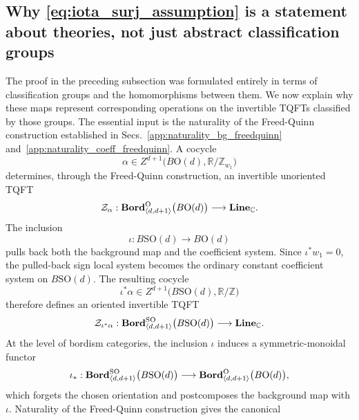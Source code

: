 \documentclass[aps,prx,reprint,superscriptaddress,twocolumn,amsmath,amssymb,amsfonts, nofootinbib]{revtex4-2}
\newcommand{\SO}{\text{SO}}
\newcommand{\bordd}{{\bf Bord}_{\langle d, d+1\rangle}}
\newcommand{\Line}{{\bf Line}_{\mathbb{C}}}
\theoremstyle{apsstyle}
\begin{document}
\subsection{Why \eqref{eq:iota_surj_assumption} is a statement about theories, not just abstract classification groups}
\label{app:O_SO_theory_naturality}

The proof in the preceding subsection was formulated entirely in terms
of classification groups and the homomorphisms between them. We now
explain why these maps represent corresponding operations on the
invertible TQFTs classified by those groups. The essential input is
the naturality of the Freed-Quinn construction established in
Secs.~\ref{app:naturality_bg_freedquinn} and~\ref{app:naturality_coeff_freedquinn}. A cocycle
\begin{equation*}
    \alpha
    \in
    Z^{d+1}\bigl(B\mathrm O(d),\mathbb R/\mathbb Z_{w_1}\bigr)
\end{equation*}
determines, through the Freed-Quinn construction, an invertible
unoriented TQFT
\begin{equation*}
    \mathcal Z_\alpha:
    \bordd^{\mathrm O}\bigl(B\mathrm O(d)\bigr)
    \longrightarrow
    \Line.
\end{equation*}
The inclusion
\begin{equation*}
    \iota:
    B\SO(d)
    \longrightarrow
    B\mathrm O(d)
\end{equation*}
pulls back both the background map and the coefficient system. Since $\iota^*w_1=0$, the pulled-back sign local system becomes the ordinary constant coefficient system on $B\SO(d)$. The resulting cocycle
\begin{equation*}
    \iota^*\alpha
    \in
    Z^{d+1}\bigl(B\SO(d),\mathbb R/\mathbb Z\bigr)
\end{equation*}
therefore defines an oriented invertible TQFT
\begin{equation*}
    \mathcal Z_{\iota^*\alpha}:
    \bordd^{\mathrm{SO}}\bigl(B\SO(d)\bigr)
    \longrightarrow
    \Line.
\end{equation*}
At the level of bordism categories, the inclusion $\iota$ induces a
symmetric-monoidal functor
\begin{equation*}
    \iota_*:
    \bordd^{\mathrm{SO}}\bigl(B\SO(d)\bigr)
    \longrightarrow
    \bordd^{\mathrm O}\bigl(B\mathrm O(d)\bigr),
\end{equation*}
which forgets the chosen orientation and postcomposes the background
map with $\iota$. Naturality of the Freed-Quinn construction gives the canonical
\end{document}
